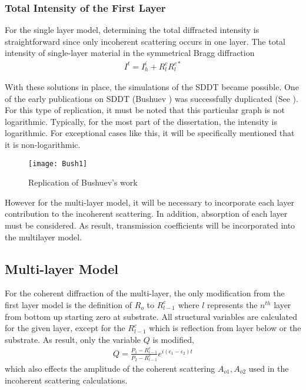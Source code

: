 \subsubsection{Total Intensity of the First Layer}

For the single layer model, determining the total diffracted intensity is straightforward since only incoherent scattering occurs in one layer.  The total intensity of single-layer material in the symmetrical Bragg diffraction
\begin{align}
I^t = I^i_h + R^c_l R_l^{c*}
\end{align}

With these solutions in place, the simulations of the SDDT became possible.  One of the early publications on SDDT (Bushuev \cite{Bushuev1}) was successfully duplicated (See ).  For this type of replication, it must be noted that this particular graph is not logarithmic.  Typically, for the most part of the dissertation, the intensity is logarithmic.   For exceptional cases like this, it will be specifically mentioned that it is non-logarithmic.  
\begin{figure}[h]
\centering
\caption{Replication of Bushuev's work \cite{Bushuev1}}
\label{Bush1}
\texttt{[image: Bush1]}
\end{figure}



However for the multi-layer model, it will be necessary to incorporate each layer contribution to the incoherent scattering. In addition, absorption of each layer must be considered.  As result, transmission coefficients will be incorporated into the multilayer model. 

		\subsection{Multi-layer Model}

For the coherent diffraction of the multi-layer, the only modification from the first layer model is the definition of $R_o$ to $R^c_{l-1}$ where $l$ represents the $n^{th}$ layer from bottom up starting zero at substrate.  All structural variables are calculated for the given layer, except for the $R^c_{l-1}$ which is reflection from layer below or the substrate.  As result, only the variable $Q$ is modified,
\begin{align}
Q = \frac{P_1 - R^c_{l-1}}{P_2 - R^c_{l-1}}e^{i (\epsilon_1 - \epsilon_2) t}
\end{align}
which also effects the amplitude of the coherent scattering $A_{o1}, A_{o2}$ used in the incoherent scattering calculations.  

